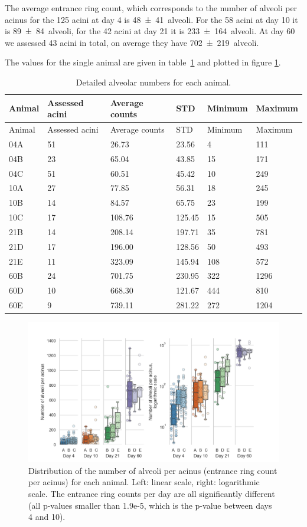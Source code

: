 \documentclass[
  american,
]{article}
\begin{document}
The average entrance ring count, which corresponds to the number of alveoli per acinus for the 125 acini at day 4 is 48~±~41~alveoli.
For the 58 acini at day 10 it is 89~±~84~alveoli, for the 42 acini at day 21 it is 233~±~164~alveoli.
At day 60 we assessed 43 acini in total, on average they have 702~±~219~alveoli.

The values for the single animal are given in table~\ref{tbl:counts} and plotted in figure \ref{fig:02}.

\begin{longtable}[]{@{}llllll@{}}
\caption{Detailed alveolar numbers for each animal. \label{tbl:counts}}\tabularnewline
\toprule
Animal & Assessed acini & Average counts & STD & Minimum & Maximum\tabularnewline
\midrule
\endfirsthead
\toprule
Animal & Assessed acini & Average counts & STD & Minimum & Maximum\tabularnewline
\midrule
\endhead
04A & 51 & 26.73 & 23.56 & 4 & 111\tabularnewline
04B & 23 & 65.04 & 43.85 & 15 & 171\tabularnewline
04C & 51 & 60.51 & 45.42 & 10 & 249\tabularnewline
10A & 27 & 77.85 & 56.31 & 18 & 245\tabularnewline
10B & 14 & 84.57 & 65.75 & 23 & 199\tabularnewline
10C & 17 & 108.76 & 125.45 & 15 & 505\tabularnewline
21B & 14 & 208.14 & 197.71 & 35 & 781\tabularnewline
21D & 17 & 196.00 & 128.56 & 50 & 493\tabularnewline
21E & 11 & 323.09 & 145.94 & 108 & 572\tabularnewline
60B & 24 & 701.75 & 230.95 & 322 & 1296\tabularnewline
60D & 10 & 668.30 & 121.67 & 444 & 810\tabularnewline
60E & 9 & 739.11 & 281.22 & 272 & 1204\tabularnewline
\bottomrule
\end{longtable}

\begin{figure}
\hypertarget{fig:02}{%
\centering
\includegraphics{images/fig02.png}
\caption{Distribution of the number of alveoli per acinus (entrance ring count per acinus) for each animal.
Left: linear scale, right: logarithmic scale.
The entrance ring counts per day are all significantly different (all p-values smaller than 1.9e-5, which is the p-value between days 4 and 10).}\label{fig:02}
}
\end{figure}
\end{document}
